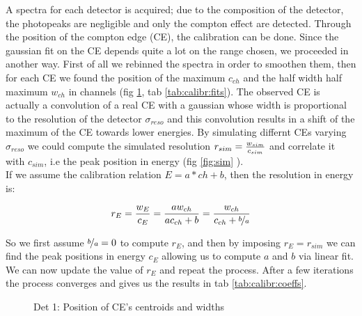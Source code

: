\documentclass[11pt,a4 paper]{article}
\let\oldfrac\frac
\renewcommand{\frac}[3][d]{\ifthenelse{\equal{#1}{d}}{\oldfrac{#2}{#3}}{\nicefrac{#2}{#3}}}
\begin{document}
A spectra for each detector is acquired; due to the composition of the detector, the photopeaks are negligible and only the compton effect are detected. Through the position of the compton edge (CE), the calibration can be done. Since the gaussian fit on the CE depends quite a lot on the range chosen, we proceeded in another way. First of all we rebinned the spectra in order to smoothen them, then for each CE we found the position of the maximum $c_{ch}$ and the half width half maximum $w_{ch}$ in channels (fig \ref{fig:det1:calibr}, tab \ref{tab:calibr:fits}).
The observed CE is actually a convolution of a real CE with a gaussian whose width is proportional to the resolution of the detector $\sigma_{reso}$ and this convolution results in a shift of the maximum of the CE towards lower energies. By simulating differnt CEs varying $\sigma_{reso}$ we could compute the simulated resolution $r_{sim} = \frac{w_{sim}}{c_{sim}}$ and correlate it with $c_{sim}$, i.e the peak position in energy (fig \ref{fig:sim} ).\\
If we assume the calibration relation $E = a*ch + b$, then the resolution in energy is:

\begin{equation*}
  r_E = \frac{w_E}{c_E} = \frac{a w_{ch}}{a c_{ch} + b} = \frac{w_{ch}}{c_{ch} + \frac[f]{b}{a}}
\end{equation*}

So we first assume $\frac[f]{b}{a} = 0$ to compute $r_E$, and then by imposing $r_E = r_{sim}$ we can find the peak positions in energy $c_E$ allowing us to compute $a$ and $b$ via linear fit. We can now update the value of $r_E$ and repeat the process. After a few iterations the process converges and gives us the results in tab \ref{tab:calibr:coeffs}.

\begin{figure}[H]
    \centering
    \caption{Det 1: Position of CE's centroids and widths}
    \label{fig:det1:calibr}
\end{figure}
\end{document}
